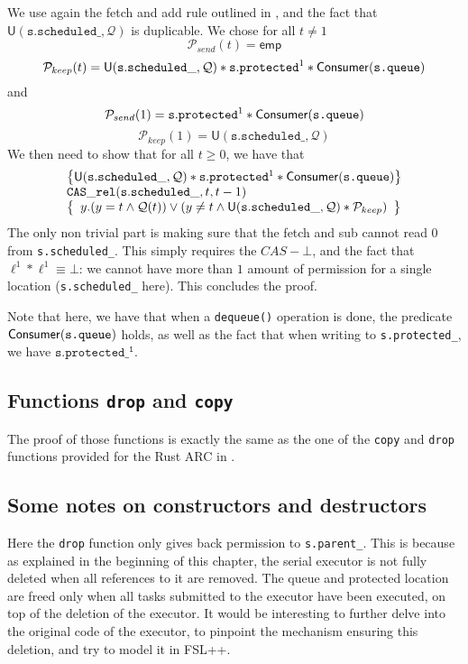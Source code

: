 We use again the fetch and add rule outlined in \cite{fsl}, and the fact that $\mathsf{U}(\mathtt{s.scheduled\_}, \mathcal{Q})$ is duplicable. We chose for all $t \neq 1$ 
$$\mathcal{P}_{send}(t) = \mathsf{emp}$$ 
$$\mathcal{P}_{keep}(t) = \mathsf{U}(\mathtt{s.scheduled\_}, \mathcal{Q}) * \mathtt{s.protected}^1 * \mathsf{Consumer}(\texttt{s.queue})$$
and 
$$\mathcal{P}_{send}(1) = \mathtt{s.protected}^1 * \mathsf{Consumer}(\texttt{s.queue})$$ 
$$\mathcal{P}_{keep}(1) = \mathsf{U}(\mathtt{s.scheduled\_}, \mathcal{Q})$$
We then need to show that for all $t \geq 0$, we have that  
\begin{equation*}
		\begin{array}{l}
		\left\{ \mathsf{U}(\mathtt{s.scheduled\_}, \mathcal{Q}) * \mathtt{s.protected}^1 * \mathsf{Consumer}(\texttt{s.queue})
		\right\}\\
				\mathtt{CAS\_rel}(\mathtt{s.scheduled\_}, t, t - 1) \\
		\left\{
				\begin{array}{l}
						y. (y = t \land \mathcal{Q}(t)) \lor (y \neq t \land \mathsf{U}(\mathtt{s.scheduled\_}, \mathcal{Q}) * \mathcal{P}_{keep})
				\end{array}
		\right\}
		\end{array}
\end{equation*}
The only non trivial part is making sure that the fetch and sub cannot read 0 from \texttt{s.scheduled\_}. This simply requires the $CAS-\bot$, and the fact that $\ell^1 * \ell^1 \equiv \bot$: we cannot have more than $1$ amount of permission for a single location (\texttt{s.scheduled\_} here). This concludes the proof.

Note that here, we have that when a \texttt{dequeue()} operation is done, the predicate $\mathsf{Consumer}(\texttt{s.queue})$ holds, as well as the fact that when writing to \texttt{s.protected\_}, we have $\mathtt{s.protected\_^1}$.

\subsection{Functions \texttt{drop} and \texttt{copy}}
The proof of those functions is exactly the same as the one of the \texttt{copy} and \texttt{drop} functions provided for the Rust ARC in \cite{gaurav}.

\subsection{Some notes on constructors and destructors}
Here the \texttt{drop} function only gives back permission to \texttt{s.parent\_}. This is because as explained in the beginning of this chapter, the serial executor is not fully deleted when all references to it are removed. The queue and protected location are freed only when all tasks submitted to the executor have been executed, on top of the deletion of the executor. It would be interesting to further delve into the original code of the executor, to pinpoint the mechanism ensuring this deletion, and try to model it in FSL++.

